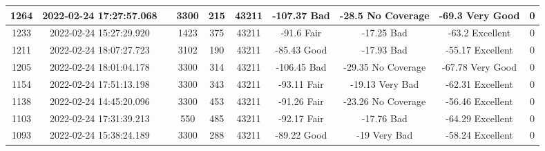 \begin{longtable*}{|c|c|c|c|c|c|c|c|c|c|}
1264&2022-02-24 17:27:57.068&&3300&215&43211& -107.37   Bad         & -28.5     No Coverage & -69.3     Very Good   & 0\\\hline
{}1233&2022-02-24 15:27:29.920&&1423&375&43211& -91.6     Fair        & -17.25    Bad         & -63.2     Excellent   & 0\\\hline
{}1211&2022-02-24 18:07:27.723&&3102&190&43211& -85.43    Good        & -17.93    Bad         & -55.17    Excellent   & 0\\\hline
{}1205&2022-02-24 18:01:04.178&&3300&314&43211& -106.45   Bad         & -29.35    No Coverage & -67.78    Very Good   & 0\\\hline
{}1154&2022-02-24 17:51:13.198&&3300&343&43211& -93.11    Fair        & -19.13    Very Bad    & -62.31    Excellent   & 0\\\hline
{}1138&2022-02-24 14:45:20.096&&3300&453&43211& -91.26    Fair        & -23.26    No Coverage & -56.46    Excellent   & 0\\\hline
{}1103&2022-02-24 17:31:39.213&&550&485&43211& -92.17    Fair        & -17.76    Bad         & -64.29    Excellent   & 0\\\hline
{}1093&2022-02-24 15:38:24.189&&3300&288&43211& -89.22    Good        & -19       Very Bad    & -58.24    Excellent   & 0\\\hline

\end{longtable*}
